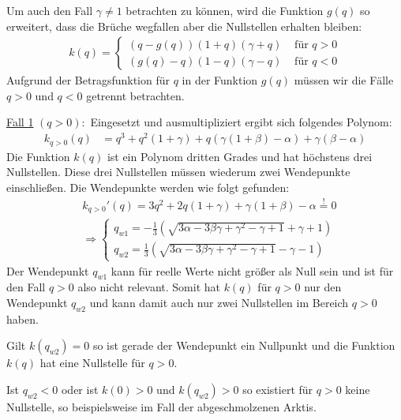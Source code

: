 \documentclass[a4paper,twoside]{article}
\begin{document}
	
	Um auch den Fall \(\gamma \neq 1\) betrachten zu können, wird die Funktion \(g(q)\) so erweitert, dass die Brüche wegfallen aber die Nullstellen erhalten bleiben:
	\begin{align*}
		k(q) = \left\{ \begin{array}{ll}
			\left( q - g\left(q\right) \right)(1 + q)(\gamma + q) &\textrm{ für } q > 0  \\
			\left( g\left(q\right) - q \right)(1 - q)(\gamma - q) &\textrm{ für } q < 0
		\end{array} \right.
	\end{align*}
	Aufgrund der Betragsfunktion für \(q\) in der Funktion \(g(q)\) müssen wir die Fälle \(q > 0\) und \(q < 0\) getrennt betrachten. 
	
	\noindent\underline{Fall 1} \((q > 0):\)
	\noindent Eingesetzt und ausmultipliziert ergibt sich folgendes Polynom:
	\begin{align*}
		k_{q>0}(q) &= q^3 + q^2(1 + \gamma) + q\left(\gamma \left(1 + \beta\right) - \alpha \right) + \gamma \left( \beta - \alpha \right)
	\end{align*}
	Die Funktion \(k(q)\) ist ein Polynom dritten Grades und hat höchstens drei Nullstellen. Diese drei Nullstellen müssen wiederum zwei Wendepunkte einschließen. Die Wendepunkte werden wie folgt gefunden:
	\begin{align*}
		&k_{q>0}'(q) = 3q^2 + 2q(1+\gamma) + \gamma(1+\beta) - \alpha \stackrel{!}{=} 0 \\
		&\Rightarrow \left\{ \begin{array}{l}
			q_{w1} = -\frac{1}{3}\left( \sqrt{3\alpha - 3\beta\gamma + \gamma^2 - \gamma + 1} +\gamma + 1 \right) \\
			q_{w2} = \frac{1}{3}\left( \sqrt{3\alpha - 3\beta\gamma + \gamma^2 - \gamma + 1} -\gamma - 1 \right)
		\end{array} \right.
	\end{align*}
	Der Wendepunkt \(q_{w1}\) kann für reelle Werte nicht größer als Null sein und ist für den Fall \(q > 0\) also nicht relevant. Somit hat \(k(q)\) für \(q > 0\) nur den Wendepunkt \(q_{w2}\) und kann damit auch nur zwei Nullstellen im Bereich \(q > 0\) haben.
	
	Gilt \(k(q_{w2}) = 0\) so ist gerade der Wendepunkt ein Nullpunkt und die Funktion \(k(q)\) hat eine Nullstelle für \(q > 0\).
	
	Ist \(q_{w2} < 0\) oder ist \(k(0) > 0\) und \(k(q_{w2}) > 0\) so existiert für \(q > 0\) keine Nullstelle, so beispielsweise im Fall der abgeschmolzenen Arktis.
	
\end{document}
